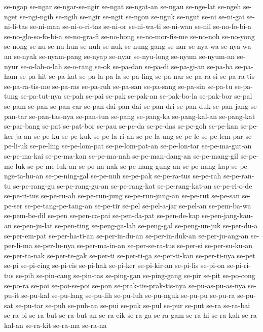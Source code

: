 {se-ngap se-ngar se-ngar-se-ngir se-ngat se-ngat-an se-ngau se-nge-lat
se-ngeh se-nget se-ngi-ngih se-ngih se-ngir se-ngit se-ngon se-nguk
se-ngut se-ni se-ni-gai se-ni-li-tas se-ni-man se-ni-o-ri-tas se-ni-or
se-ni-wa-ti se-ni-wan se-nil se-no-fo-bi-a se-no-glo-so-fo-bi-a
se-no-gra-fi se-no-hong se-no-mor-fis-me se-no-noh se-no-yong se-nong
se-nu se-nu-hun se-nuh se-nuk se-nung-gang se-nur se-nya-wa se-nya-wa-an
se-nyak se-nyam-pang se-nyap se-nyar se-nyu-long se-nyum se-nyum-an
se-nyur se-o-lah-o-lah se-o-rang se-ok se-pa-dan se-pa-di se-pa-gi-an
se-pa-ha se-pa-ham se-pa-hit se-pa-kat se-pa-la-pa-la se-pa-ling se-pa-nar
se-pa-ra-si se-pa-ra-tis se-pa-ra-tis-me se-pa-ras se-pa-ruh se-pa-san
se-pa-sang se-pa-sin se-pa-tu se-pa-tung se-pa-tut-nya se-pah se-pai
se-pak se-pak-an se-pak-bo-la se-pak-bor se-pal se-pam se-pan se-pan-car
se-pan-dai-pan-dai se-pan-dri se-pan-duk se-pan-jang se-pan-tar
se-pan-tas-nya se-pan-tun se-pang se-pang-ka se-pang-kal-an se-pang-kat
se-par-bang se-pat se-pat-bor se-pau se-pe-da se-pe-das se-pe-goh
se-pe-kan se-pe-ker-ja-an se-pe-ku se-pe-kuk se-pe-la-ri-an se-pe-la-ung
se-pe-le se-pe-lem-par se-pe-li-uk se-pe-ling se-pe-lom-pat
se-pe-lom-pat-an se-pe-lon-tar se-pe-ma-gut-an se-pe-ma-kai se-pe-ma-kan
se-pe-ma-nah se-pe-man-dang-an se-pe-mang-gil se-pe-me-luk se-pe-me-luk-an
se-pe-na-nak se-pe-nang-gung-an se-pe-nang-kap se-pe-nge-ta-hu-an
se-pe-ning-gal se-pe-nuh se-pe-pak se-pe-ra-tus se-pe-rah se-pe-ran-tu
se-pe-rang-gu se-pe-rang-gu-an se-pe-rang-kat se-pe-rang-kat-an
se-pe-ri-o-de se-pe-ri-tus se-pe-ru-ah se-pe-run-jung se-pe-run-jung-an
se-pe-rut se-pe-san se-pe-ser se-pe-tang-pe-tang-an se-pe-tir se-pel
se-pel-a-jar se-pel-an se-pem-ba-wa se-pem-be-dil se-pen se-pen-ca-pai
se-pen-da-pat se-pen-de-kap se-pen-jang-kau-an se-pen-ju-lat se-pen-ting
se-peng-ga-lah se-peng-gal se-peng-un-juk se-per-du-a se-per-em-pat
se-per-ha-ti-an se-per-in-du-an se-per-in-duk-an se-per-ju-ang-an
se-per-li-ma se-per-lu-nya se-per-ma-in-an se-per-se-ra-tus se-per-si
se-per-su-ku-an se-per-ta-nak se-per-te-gak se-per-ti se-per-ti-ga
se-per-ti-kan se-per-ti-nya se-pet se-pi se-pi-cing se-pi-cis se-pi-hak
se-pi-ker se-pi-kir-an se-pi-lis se-pi-on se-pi-ri-tus se-pih se-pin-cang
se-pin-tas se-ping-gan se-ping-gang se-pir se-pit se-po-cong se-po-ra
se-poi se-poi-se-poi se-pon se-prak-tis-prak-tis-nya se-pu-as-pu-as-nya
se-pu-it se-pu-kal se-pu-lang se-pu-lih se-pu-luh se-pu-nguk se-pu-pu
se-pu-ra se-pu-sat se-pu-tar se-puh se-puh-an se-pui se-puk se-pul se-pur
se-put se-ra se-ra-bai se-ra-bi se-ra-but se-ra-but-an se-ra-cik se-ra-ga
se-ra-gam se-ra-hi se-ra-kah se-ra-kal-an se-ra-kit se-ra-ma se-ra-na
}
